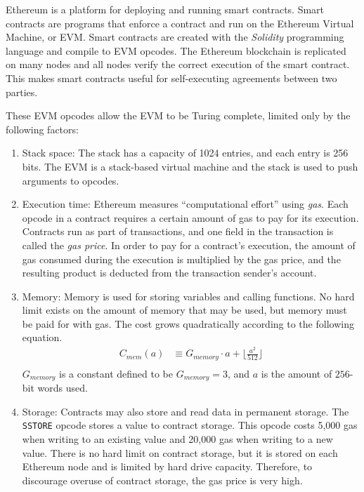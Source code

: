 \documentclass[12pt]{article}
\begin{document}
Ethereum is a platform for deploying and running smart contracts. Smart contracts are programs that enforce a contract and run on the Ethereum Virtual Machine, or EVM. Smart contracts are created with the \emph{Solidity} programming language and compile to EVM opcodes. The Ethereum blockchain is replicated on many nodes and all nodes verify the correct execution of the smart contract. This makes smart contracts useful for self-executing agreements between two parties.

These EVM opcodes allow the EVM to be Turing complete, limited only by the following factors:
\begin{enumerate}
  \item Stack space: The stack has a capacity of 1024 entries, and each entry is 256 bits. The EVM is a stack-based virtual machine and the stack is used to push arguments to opcodes.
  \item Execution time: Ethereum measures ``computational effort'' using \emph{gas}. Each opcode in a contract requires a certain amount of gas to pay for its execution. Contracts run as part of transactions, and one field in the transaction is called the \emph{gas price}. In order to pay for a contract's execution, the amount of gas consumed during the execution is multiplied by the gas price, and the resulting product is deducted from the transaction sender's account.
  \item Memory: Memory is used for storing variables and calling functions. No hard limit exists on the amount of memory that may be used, but memory must be paid for with gas. The cost grows quadratically according to the following equation.
  \begin{align*}
    C_{mem}(a) &\equiv G_{memory} \cdot a + \lfloor \frac{a^2}{512} \rfloor \\
  \end{align*}
  $G_{memory}$ is a constant defined to be $G_{memory} = 3$, and $a$ is the amount of $256$-bit words used.
  \item Storage: Contracts may also store and read data in permanent storage. The \texttt{SSTORE} opcode stores a value to contract storage. This opcode costs 5,000 gas when writing to an existing value and 20,000 gas when writing to a new value. There is no hard limit on contract storage, but it is stored on each Ethereum node and is limited by hard drive capacity. Therefore, to discourage overuse of contract storage, the gas price is very high.
\end{enumerate}
\end{document}
